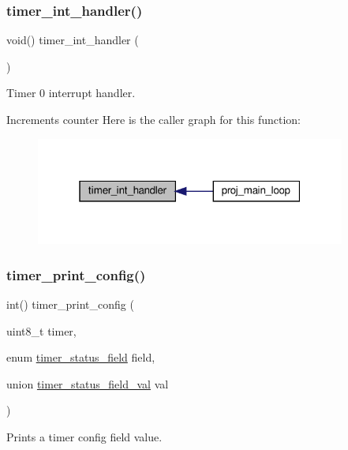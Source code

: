 \subsubsection{\texorpdfstring{timer\+\_\+int\+\_\+handler()}{timer\_int\_handler()}}
{\footnotesize\ttfamily void() timer\+\_\+int\+\_\+handler (\begin{DoxyParamCaption}{ }\end{DoxyParamCaption})}



Timer 0 interrupt handler. 

Increments counter Here is the caller graph for this function\+:\nopagebreak
\begin{figure}[H]
\begin{center}
\leavevmode
\includegraphics[width=289pt]{group__timer_ga91a2072306c68353712a6b771287dc2c_icgraph}
\end{center}
\end{figure}
\mbox{\label{group__timer_gad3902e029b27c80982873394c0290496}} 
\subsubsection{\texorpdfstring{timer\+\_\+print\+\_\+config()}{timer\_print\_config()}}
{\footnotesize\ttfamily int() timer\+\_\+print\+\_\+config (\begin{DoxyParamCaption}\item[{uint8\+\_\+t}]{timer,  }\item[{enum \hyperlink{group__timer_gada782f3116a896caaa602b70c0c6d8b7}{timer\+\_\+status\+\_\+field}}]{field,  }\item[{union \hyperlink{uniontimer__status__field__val}{timer\+\_\+status\+\_\+field\+\_\+val}}]{val }\end{DoxyParamCaption})}



Prints a timer config field value. 

